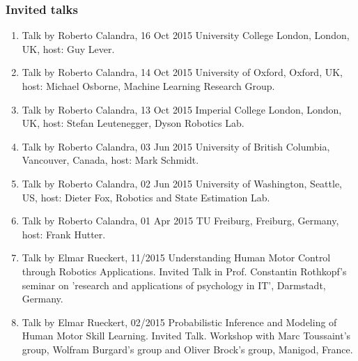 \subsubsection{Invited talks}

\begin{enumerate}

\item Talk by Roberto Calandra, 16 Oct 2015 University College London, London, UK, host: Guy Lever.
\item Talk by Roberto Calandra, 14 Oct 2015 University of Oxford, Oxford, UK, host: Michael Osborne, Machine Learning Research Group.
\item Talk by Roberto Calandra, 13 Oct 2015 Imperial College London, London, UK, host: Stefan Leutenegger, Dyson Robotics Lab.
\item Talk by Roberto Calandra, 03 Jun 2015 University of British Columbia, Vancouver, Canada, host: Mark Schmidt.
\item Talk by Roberto Calandra, 02 Jun 2015 University of Washington, Seattle, US, host: Dieter Fox, Robotics and State Estimation Lab.
\item Talk by Roberto Calandra, 01 Apr 2015 TU Freiburg, Freiburg, Germany, host: Frank Hutter.

\item Talk by Elmar Rueckert, 11/2015 Understanding Human Motor Control through Robotics Applications. Invited Talk in Prof. Constantin Rothkopf’s seminar on ’research and applications of psychology in IT’, Darmstadt, Germany.
\item Talk by Elmar Rueckert, 02/2015 Probabilistic Inference and Modeling of Human Motor Skill Learning. Invited Talk. Workshop with Marc Toussaint’s group, Wolfram Burgard’s group and Oliver Brock’s group, Manigod, France.



\end{enumerate}
